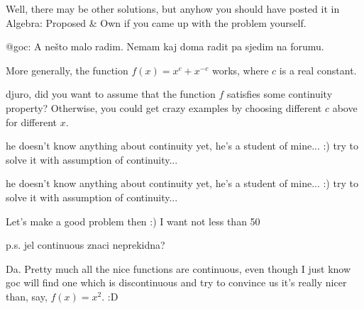 \begin{mysolution}
	Well, there may be other solutions, but anyhow you should have posted it in Algebra: Proposed \& Own if you came up with the problem yourself.

@goc: A nešto malo radim. Nemam kaj doma radit pa sjedim na forumu.
\end{mysolution}



\begin{mysolution}
	More generally, the function $f(x) = x^{c}+x^{-c}$ works, where $c$ is a real constant.

djuro, did you want to assume that the function $f$ satisfies some continuity property?  Otherwise, you could get crazy examples by choosing different $c$ above for different $x$.
\end{mysolution}



\begin{mysolution}
	he doesn't know anything about continuity yet, he's a student of mine... :)
try to solve it with assumption of continuity...
\end{mysolution}



\begin{mysolution}
	\begin{tcolorbox}he doesn't know anything about continuity yet, he's a student of mine... :)
try to solve it with assumption of continuity...\end{tcolorbox}

Let's make a good problem then :)
I want not less than 50%

p.s. jel continuous znaci neprekidna?
\end{mysolution}



\begin{mysolution}
	Da. Pretty much all the nice functions are continuous, even though I just know goc will find one which is discontinuous and try to convince us it's really nicer than, say, $f(x)=x^{2}$.  :D 

\end{mysolution}



